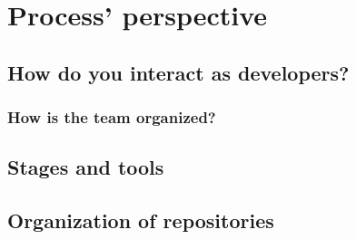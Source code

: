 \section{Process' perspective}
\subsection{How do you interact as developers?}
\subsubsection{How is the team organized?}
\subsection{Stages and tools}
\subsection{Organization of repositories}
